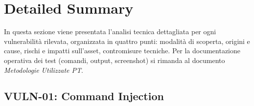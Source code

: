 \documentclass[11pt]{report}
\begin{document}
	
	\chapter{Detailed Summary}
	\label{sec:detailed}
	In questa sezione viene presentata l'analisi tecnica dettagliata per ogni vulnerabilità rilevata, organizzata in quattro punti: modalità di scoperta, origini e cause, rischi e impatti sull'asset, contromisure tecniche. Per la documentazione operativa dei test (comandi, output, screenshot) si rimanda al documento \textit{Metodologie Utilizzate PT}.
	
	\section{VULN-01: Command Injection}
\end{document}
